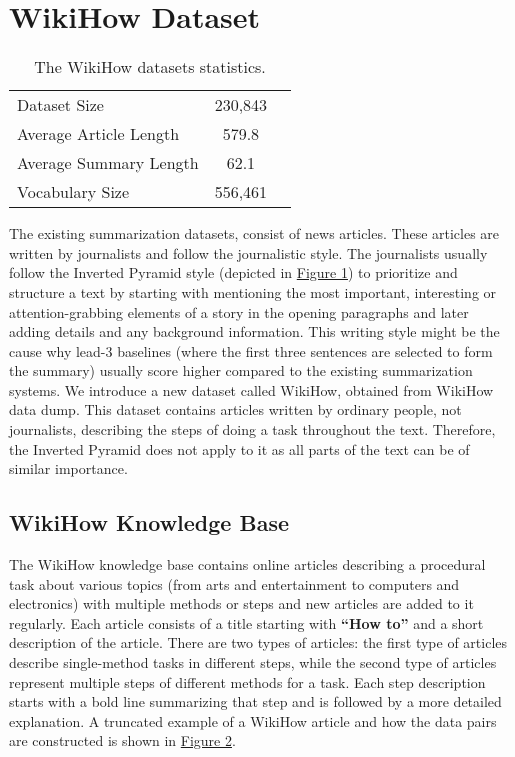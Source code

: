 \documentclass[11pt,a4paper]{article}
\begin{document}
\section{WikiHow Dataset}
\begin{table}[t]
\footnotesize
\label{tbl:1}
\centering
\begin{tabular}{lcc}
\hline
Dataset Size&230,843\\
Average Article Length&579.8\\
Average Summary Length&62.1\\
Vocabulary Size&556,461\\
\hline
\end{tabular}
\caption{The WikiHow datasets statistics.}
 \vspace*{-2ex}
\end{table} 
The existing summarization datasets, consist of news articles. These articles are written by journalists and follow the journalistic style. The journalists usually follow the Inverted Pyramid style \cite{po2003news} (depicted in \hyperref[fig:pyramid]{Figure 1}) to prioritize and structure a text by starting with mentioning the most important, interesting or attention-grabbing elements of a story in the opening paragraphs and later adding details and any background information. This writing style might be the cause why lead-3 baselines (where the first three sentences are selected to form the summary) usually score higher compared to the existing summarization systems.  
We introduce a new dataset called WikiHow, obtained from WikiHow data dump. This dataset contains articles written by ordinary people, not journalists, describing the steps of doing a task throughout the text. Therefore, the Inverted Pyramid does not apply to it as all parts of the text can be of similar importance. 


\subsection{WikiHow Knowledge Base}
The WikiHow knowledge base contains online articles describing a procedural task about various topics (from arts and entertainment to computers and electronics) with multiple methods or steps and new articles are added to it regularly. Each article consists of a title starting with \textbf{``How to''} and a short description of the article. There are two types of articles: the first type of articles describe single-method tasks in different steps, while the second type of articles represent multiple steps of different methods for a task. Each step description starts with a bold line summarizing that step and is followed by a more detailed explanation. A truncated example of a WikiHow article and how the data pairs are constructed is shown in \hyperref[fig:wikihow]{Figure 2}. 
\end{document}
